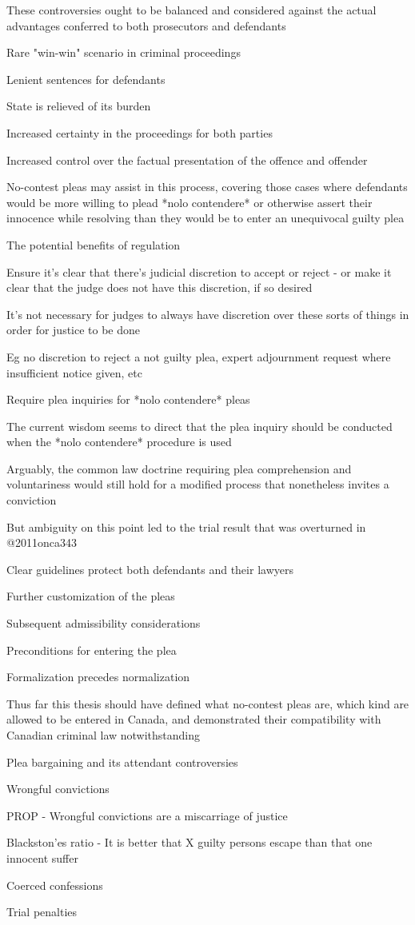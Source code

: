 These controversies ought to be balanced and considered against the actual advantages conferred to both prosecutors and defendants

Rare "win-win" scenario in criminal proceedings

Lenient sentences for defendants

State is relieved of its burden

Increased certainty in the proceedings for both parties

Increased control over the factual presentation of the offence and offender

No-contest pleas may assist in this process, covering those cases where defendants would be more willing to plead *nolo contendere* or otherwise assert their innocence while resolving than they would be to enter an unequivocal guilty plea

The potential benefits of regulation

Ensure it's clear that there's judicial discretion to accept or reject - or make it clear that the judge does not have this discretion, if so desired

It's not necessary for judges to always have discretion over these sorts of things in order for justice to be done

Eg no discretion to reject a not guilty plea, expert adjournment request where insufficient notice given, etc

Require plea inquiries for *nolo contendere* pleas

The current wisdom seems to direct that the plea inquiry should be conducted when the *nolo contendere* procedure is used

Arguably, the common law doctrine requiring plea comprehension and voluntariness would still hold for a modified process that nonetheless invites a conviction

But ambiguity on this point led to the trial result that was overturned in @2011onca343

Clear guidelines protect both defendants and their lawyers

Further customization of the pleas

Subsequent admissibility considerations

Preconditions for entering the plea

Formalization precedes normalization

Thus far this thesis should have defined what no-contest pleas are, which kind are allowed to be entered in Canada, and demonstrated their compatibility with Canadian criminal law notwithstanding

Plea bargaining and its attendant controversies

Wrongful convictions

PROP - Wrongful convictions are a miscarriage of justice

Blackston'es ratio - It is better that X guilty persons escape than that one innocent suffer

Coerced confessions

Trial penalties